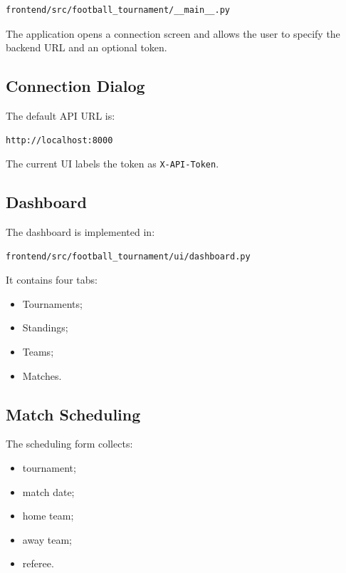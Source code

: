 \documentclass[11pt,a4paper]{article}
\begin{document}
\begin{lstlisting}
frontend/src/football_tournament/__main__.py
\end{lstlisting}

The application opens a connection screen and allows the user to
specify the backend URL and an optional token.

\subsection{Connection Dialog}

The default API URL is:

\begin{lstlisting}
http://localhost:8000
\end{lstlisting}

The current UI labels the token as \texttt{X-API-Token}.

\subsection{Dashboard}

The dashboard is implemented in:

\begin{lstlisting}
frontend/src/football_tournament/ui/dashboard.py
\end{lstlisting}

It contains four tabs:

\begin{itemize}
    \item Tournaments;
    \item Standings;
    \item Teams;
    \item Matches.
\end{itemize}

\subsection{Match Scheduling}

The scheduling form collects:

\begin{itemize}
    \item tournament;
    \item match date;
    \item home team;
    \item away team;
    \item referee.
\end{itemize}
\end{document}
